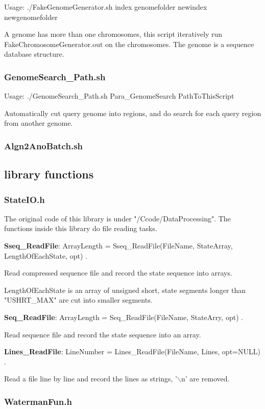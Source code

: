 \documentclass[a4paper]{article}
\begin{document}
\begin{CJK*}{UTF8}{kai}
Usage: ./FakeGenomeGenerator.sh index genomefolder newindex newgenomefolder

A genome has more than one chromosomes, this script iteratively run FakeChromosomeGenerator.out on the chromosomes. The genome is a sequence database structure.

\subsubsection{GenomeSearch\_Path.sh}

Usage: ./GenomeSearch\_Path.sh Para\_GenomeSearch PathToThisScript

Automatically cut query genome into regions, and do search for each query region from another genome.

\subsubsection{Algn2AnoBatch.sh}

\subsection{library functions}
\subsubsection{StateIO.h}
The original code of this library is under "/Ccode/DataProcessing". The functions inside this library do file reading tasks.

\noindent
\textbf{Sseq\_ReadFile}: ArrayLength = Sseq\_ReadFile(FileName, StateArray, LengthOfEachState, opt) .

Read compressed sequence file and record the state sequence into arrays.

LengthOfEachState is an array of unsigned short, state segments longer than "USHRT\_MAX" are cut into smaller segments.

\noindent
\textbf{Seq\_ReadFile}: ArrayLength = Seq\_ReadFile(FileName, StateArry, opt) .

Read sequence file and record the state sequence into an array.

\noindent
\textbf{Lines\_ReadFile}: LineNumber = Lines\_ReadFile(FileName, Lines, opt=NULL)  .

Read a file line by line and record the lines as strings, '$\backslash$n' are removed.

\subsubsection{WatermanFun.h}


\end{CJK*}
\end{document}
